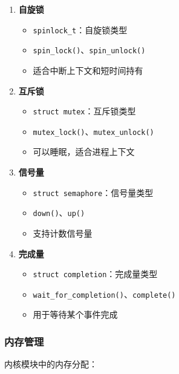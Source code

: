 \begin{enumerate}
  \item \textbf{自旋锁}
    \begin{itemize}
      \item \texttt{spinlock\_t}：自旋锁类型
      \item \texttt{spin\_lock()}、\texttt{spin\_unlock()}
      \item 适合中断上下文和短时间持有
    \end{itemize}

  \item \textbf{互斥锁}
    \begin{itemize}
      \item \texttt{struct mutex}：互斥锁类型
      \item \texttt{mutex\_lock()}、\texttt{mutex\_unlock()}
      \item 可以睡眠，适合进程上下文
    \end{itemize}

  \item \textbf{信号量}
    \begin{itemize}
      \item \texttt{struct semaphore}：信号量类型
      \item \texttt{down()}、\texttt{up()}
      \item 支持计数信号量
    \end{itemize}

  \item \textbf{完成量}
    \begin{itemize}
      \item \texttt{struct completion}：完成量类型
      \item \texttt{wait\_for\_completion()}、\texttt{complete()}
      \item 用于等待某个事件完成
    \end{itemize}
\end{enumerate}

\subsubsection{内存管理}

内核模块中的内存分配：

